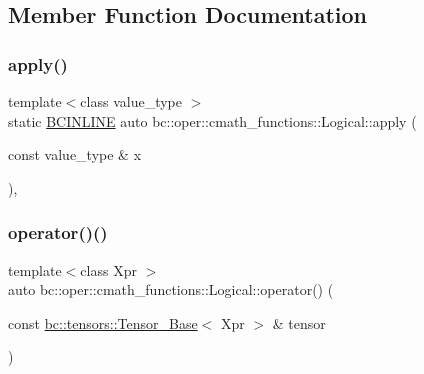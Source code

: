 \subsection{Member Function Documentation}
\mbox{\label{structbc_1_1oper_1_1cmath__functions_1_1Logical_ac21786a26721129cf03c06dc5ec85543}} 
\subsubsection{\texorpdfstring{apply()}{apply()}}
{\footnotesize\ttfamily template$<$class value\+\_\+type $>$ \\
static \hyperlink{common_8h_a6699e8b0449da5c0fafb878e59c1d4b1}{B\+C\+I\+N\+L\+I\+NE} auto bc\+::oper\+::cmath\+\_\+functions\+::\+Logical\+::apply (\begin{DoxyParamCaption}\item[{const value\+\_\+type \&}]{x }\end{DoxyParamCaption})\hspace{0.3cm}{\ttfamily [inline]}, {\ttfamily [static]}}

\mbox{\label{structbc_1_1oper_1_1cmath__functions_1_1Logical_afae5f8a5c6a0f87edef4555448e672b0}} 
\subsubsection{\texorpdfstring{operator()()}{operator()()}\hspace{0.1cm}{\footnotesize\ttfamily [1/3]}}
{\footnotesize\ttfamily template$<$class Xpr $>$ \\
auto bc\+::oper\+::cmath\+\_\+functions\+::\+Logical\+::operator() (\begin{DoxyParamCaption}\item[{const \hyperlink{classbc_1_1tensors_1_1Tensor__Base}{bc\+::tensors\+::\+Tensor\+\_\+\+Base}$<$ Xpr $>$ \&}]{tensor }\end{DoxyParamCaption})\hspace{0.3cm}{\ttfamily [inline]}}

